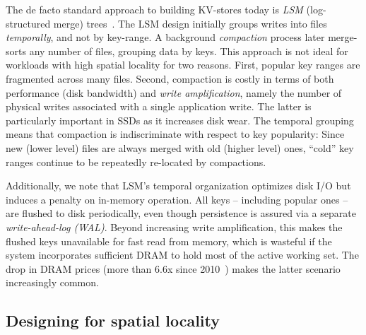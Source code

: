 The de facto standard approach to building KV-stores today is \emph{LSM} (log-structured merge) trees~\cite{DBLP:journals/acta/ONeilCGO96}. 
The LSM design initially groups writes  into files \emph{temporally}, and not by key-range. 
A background \emph{compaction} process later merge-sorts any number of files, grouping data by keys. 
This approach is not ideal for workloads with high spatial locality for two reasons. 
First,  popular key ranges are fragmented across many files. %
Second,  compaction  is costly in terms of  both performance 
(disk bandwidth) and \emph{write amplification}, namely the number of physical writes 
associated with a single application write. The latter is  particularly important in SSDs as it increases disk wear. 
The temporal grouping means that compaction is indiscriminate with respect to key popularity:  
Since new (lower level) files are always merged with old (higher level) ones, 
 ``cold'' key ranges
 continue to be repeatedly re-located
by  compactions.  

Additionally, we note that LSM's temporal  organization optimizes disk I/O but induces a penalty on in-memory operation. 
All keys -- including popular ones -- are flushed to disk periodically, even though persistence is assured 
via a separate \emph{write-ahead-log (WAL)}.
Beyond increasing write amplification, this makes the flushed keys unavailable for fast read from memory,
which is  wasteful if the system incorporates sufficient DRAM to hold most of the active working set. 
The drop in DRAM prices (more than $6.6$x since 2010~\cite{dram-prices})  
makes the latter scenario increasingly common.  

\subsection{Designing for spatial locality} 

